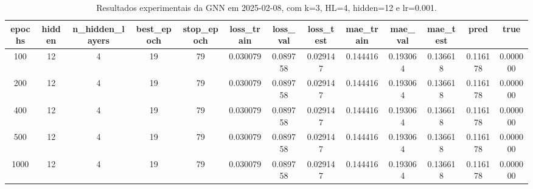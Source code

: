 \begin{table}[h]
\centering
\caption{Resultados experimentais da GNN em 2025-02-08, com k=3, HL=4, hidden=12 e lr=0.001.}
\label{tab:gnn_results_k3_hl4_h12_d20250208}
\begin{tabular}{ccccccccccccc}
\toprule
epochs & hidden & n\_hidden\_layers & best\_epoch & stop\_epoch & loss\_train & loss\_val & loss\_test & mae\_train & mae\_val & mae\_test & pred & true \\
\midrule
100 & 12 & 4 & 19 & 79 & 0.030079 & 0.089758 & 0.029147 & 0.144416 & 0.193064 & 0.136618 & 0.116178 & 0.000000 \\
200 & 12 & 4 & 19 & 79 & 0.030079 & 0.089758 & 0.029147 & 0.144416 & 0.193064 & 0.136618 & 0.116178 & 0.000000 \\
400 & 12 & 4 & 19 & 79 & 0.030079 & 0.089758 & 0.029147 & 0.144416 & 0.193064 & 0.136618 & 0.116178 & 0.000000 \\
500 & 12 & 4 & 19 & 79 & 0.030079 & 0.089758 & 0.029147 & 0.144416 & 0.193064 & 0.136618 & 0.116178 & 0.000000 \\
1000 & 12 & 4 & 19 & 79 & 0.030079 & 0.089758 & 0.029147 & 0.144416 & 0.193064 & 0.136618 & 0.116178 & 0.000000 \\
\bottomrule
\end{tabular}
\end{table}
